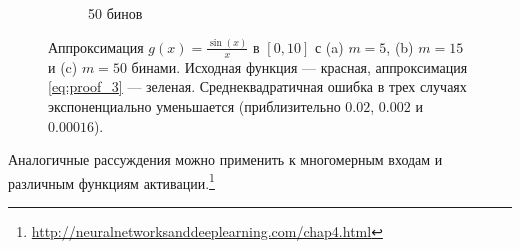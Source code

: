\begin{figure}[t]
\begin{subfigure}[b]{0.32\textwidth}
    \caption{50 бинов}
    \end{subfigure}
    \hfill
    \caption{Аппроксимация $g(x) = \frac{\sin(x)}{x}$ в $[0,10]$ с (a) $m=5$, (b) $m=15$ и (c) $m=50$ бинами. Исходная функция — красная, аппроксимация \eqref{eq:proof_3} — зеленая. Среднеквадратичная ошибка в трех случаях экспоненциально уменьшается (приблизительно $0.02$, $0.002$ и $0.00016$).}
    \label{fig:sin_approximation}
\end{figure}

Аналогичные рассуждения можно применить к многомерным входам и различным функциям активации.\footnote{\url{http://neuralnetworksanddeeplearning.com/chap4.html}}